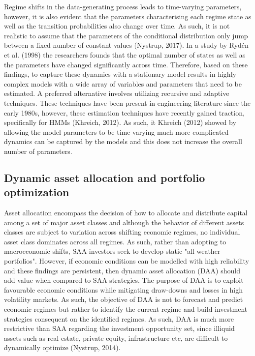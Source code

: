 Regime shifts in the data-generating process leads to time-varying parameters, however, it is also evident that the parameters characterising each regime state as well as the transition probabilities also change over time. As such, it is not realistic to assume that the parameters of the conditional distribution only jump between a fixed number of constant values (Nystrup, 2017). In a study by Rydén et al. (1998) the researchers founds that the optimal number of states as well as the parameters have changed significantly across time. Therefore, based on these findings, to capture these dynamics with a stationary model results in highly complex models with a wide array of variables and parameters that need to be estimated. A preferred alternative involves utilizing recursive and adaptive techniques. These techniques have been present in engineering literature since the early 1980s, however, these estimation techniques have recently gained traction, specifically for HMMs (Khreich, 2012). As such, it Khreich (2012) showed by allowing the model parameters to be time-varying much more complicated dynamics can be captured by the models and this does not increase the overall number of parameters.

\subsection*{Dynamic asset allocation and portfolio optimization}
Asset allocation encompass the decision of how to allocate and distribute capital among a set of major asset classes and although the behavior of different assets classes are subject to variation across shifting economic regimes, no individual asset class dominates across all regimes. As such, rather than adopting to macroeconomic shifts, SAA investors seek to develop static "all-weather portfolios". However, if economic conditions can be modelled with high reliability and these findings are persistent, then dynamic asset allocation (DAA) should add value when compared to SAA strategies. The purpose of DAA is to exploit favourable economic conditions while mitigating draw-downs and losses in high volatility markets. As such, the objective of DAA is not to forecast and predict economic regimes but rather to identify the current regime and build investment strategies consequent on the identified regimes. As such, DAA is much more restrictive than SAA regarding the investment opportunity set, since illiquid assets such as real estate, private equity, infrastructure etc, are difficult to dynamically optimize (Nystrup, 2014).

